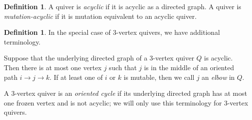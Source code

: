 \documentclass[12pt]{amsart}
\theoremstyle{definition}
\newtheorem{defn}[thm]{Definition}
\theoremstyle{remark}
\numberwithin{equation}{section}
\begin{document}
\begin{defn}
\label{def:acyclic}
A quiver is \emph{acyclic} if it is acyclic as a directed graph. 
A quiver is \emph{mutation-acyclic} if it is mutation equivalent to an acyclic quiver.
\end{defn}

\begin{defn}
\label{def:elbow-oriented}
In the special case of $3$-vertex quivers, we have additional terminology. 

Suppose that the underlying directed graph of a $3$-vertex quiver $Q$ is acyclic. Then there is at most one vertex $j$ such that $j$ is in the middle of an oriented path $i \rightarrow j \rightarrow k$. If at least one of $i$ or $k$ is mutable, then we call $j$ an \emph{elbow} in $Q$.

A $3$-vertex quiver is an \emph{oriented cycle} if its underlying directed graph has at most one frozen vertex and is not acyclic; we will only use this terminology for $3$-vertex quivers.
\end{defn}
\end{document}
